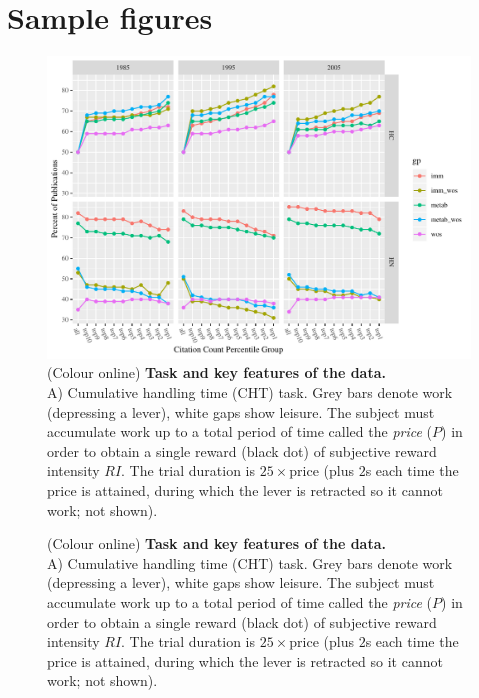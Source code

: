\documentclass[NETN]{stjour}
\begin{document}
\section{Sample figures}

\begin{figure}[h] 
\centerline{\includegraphics[width=\textwidth]{Fig1.pdf}}
\caption{(Colour online) \textbf{Task and key features of the
 data.} \\
 A) Cumulative handling time (CHT) task. Grey bars denote work
(depressing a lever), white gaps show leisure. The subject must
accumulate work up to a total period of time called the
\emph{price} ($P$) in order to obtain a single reward (black dot) of subjective reward
intensity $RI$. The trial duration is $25\times \mathrm{price}$ (plus
$2$s each time the price is attained, during which the lever is retracted so it cannot
work; not shown).}
\label{fig:task_data}
\end{figure}
\eject

\begin{figure}[ht] 
\caption{(Colour online) \textbf{Task and key features of the
 data.} \\
 A) Cumulative handling time (CHT) task. Grey bars denote work
(depressing a lever), white gaps show leisure. The subject must
accumulate work up to a total period of time called the
\emph{price} ($P$) in order to obtain a single reward (black dot) of subjective reward
intensity $RI$. The trial duration is $25\times \mathrm{price}$ (plus
$2$s each time the price is attained, during which the lever is retracted so it cannot
work; not shown).}
\label{fig:task_data2}
\end{figure}
\end{document}
